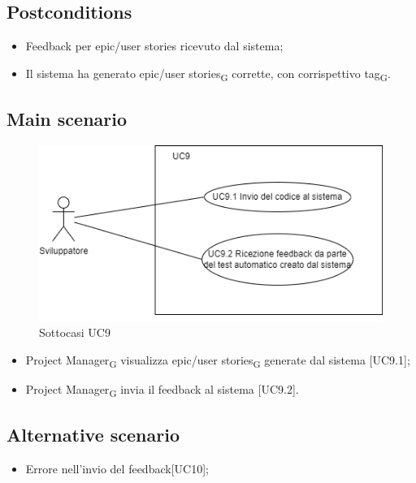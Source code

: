 \documentclass{article}
\begin{document}
    \subsection*{Postconditions}
        \begin{itemize}
            \item Feedback per epic/user stories ricevuto dal sistema;
            \item Il sistema ha generato epic/user stories\textsubscript{G} corrette, con corrispettivo tag\textsubscript{G}.
        \end{itemize}
        
    \subsection*{Main scenario}
        \begin{figure}[h]
          \centering
          \includegraphics{./imgUML/UC9-zoom.png}
          \caption{Sottocasi UC9}
          \label{fig:UC9_sottocasi}
        \end{figure}

        \begin{itemize}
            \item Project Manager\textsubscript{G} visualizza epic/user stories\textsubscript{G} generate dal sistema [UC9.1];
            \item Project Manager\textsubscript{G} invia il feedback al sistema [UC9.2].
        \end{itemize}
        
    \subsection*{Alternative scenario}
        
        \begin{itemize}
            \item Errore nell'invio del feedback[UC10];
        \end{itemize}
        
\end{document}
